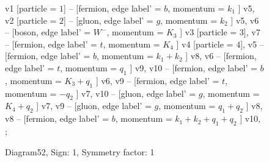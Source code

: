 \documentclass{revtex4}
\begin{document}
\begin{figure}[!htb]
\begin{center}
{    %
v1 [particle = \(1\)] -- [fermion, edge label' = \(b\), momentum = \(k_{1}\) ] v5, 
v2 [particle = \(2\)] -- [gluon, edge label' = \(g\), momentum = \(k_{2}\) ] v5, 
v6 -- [boson, edge label' = \(W^{-}\), momentum = \(K_{3}\) ] v3 [particle = \(3\)], 
v7 -- [fermion, edge label' = \(t\), momentum = \(K_{4}\) ] v4 [particle = \(4\)], 
v5 -- [fermion, edge label' = \(b\), momentum = \(k_{1} + k_{2}\) ] v8, 
v6 -- [fermion, edge label' = \(t\), momentum = \(q_{1}\) ] v9, 
v10 -- [fermion, edge label' = \(b\), momentum = \(K_{3} + q_{1}\) ] v6, 
v9 -- [fermion, edge label' = \(t\), momentum = \(-q_{2}\) ] v7, 
v10 -- [gluon, edge label' = \(g\), momentum = \(K_{4} + q_{2}\) ] v7, 
v9 -- [gluon, edge label' = \(g\), momentum = \(q_{1} + q_{2}\) ] v8, 
v8 -- [fermion, edge label' = \(b\), momentum = \(k_{1} + k_{2} + q_{1} + q_{2}\) ] v10, 
};
\end{center}
\caption{Diagram52, Sign: 1, Symmetry factor: 1}
\end{figure}
\newpage
\end{document}
